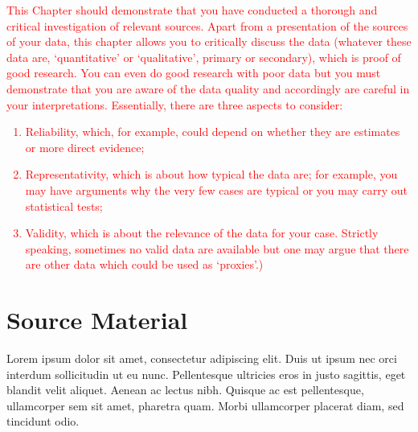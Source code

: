 \textcolor{red}{This Chapter should demonstrate that you have conducted a thorough and critical investigation of relevant sources.
Apart from a presentation of the sources of your data, this chapter allows you to critically discuss the data (whatever these data are, ‘quantitative’ or ‘qualitative’, primary or secondary), which is proof of good research. You can even do good research with poor data but you must demonstrate that you are aware of the data quality and accordingly are careful in your interpretations. Essentially, there are three aspects to consider:
\begin{enumerate}
\item	Reliability, which, for example, could depend on whether they are estimates or more direct evidence;
\item	Representativity, which is about how typical the data are; for example, you may have arguments why the very few cases are typical or you may carry out statistical tests;
\item Validity, which is about the relevance of the data for your case. Strictly speaking, sometimes no valid data are available but one may argue that there are other data which could be used as ‘proxies’.) 
\end{enumerate}
}
\section{Source Material}
Lorem ipsum dolor sit amet, consectetur adipiscing elit. Duis ut ipsum nec orci interdum sollicitudin ut eu nunc. Pellentesque ultricies eros in justo sagittis, eget blandit velit aliquet. Aenean ac lectus nibh. Quisque ac est pellentesque, ullamcorper sem sit amet, pharetra quam. Morbi ullamcorper placerat diam, sed tincidunt odio.

